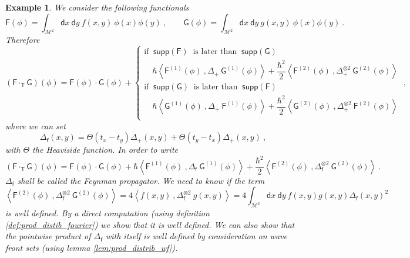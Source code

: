 \documentclass[11pt]{book}
\newcommand{\supp}{\mathsf{supp}}
\newcommand{\sm}[1]{\left\langle#1\right\rangle}
\newcommand{\Mcal}{\mathcal{M}}
\newcommand{\Fsf}{\mathsf{F}}
\newcommand{\Gsf}{\mathsf{G}}
\newcommand{\Tsf}{\mathsf{T}}
\newcommand{\dsf}{\mathsf{d}}
\newcommand{\fsf}{\mathsf{f}}
\theoremstyle{break}
\newtheorem{example}{Example}[chapter]
\begin{document}
\begin{example}
We consider the following functionals
%
\begin{equation*}
\Fsf(\phi) = \int_{\Mcal^2} \dsf x \ \dsf y \ f(x,y) \ \phi(x) \phi(y)\ , \qquad \Gsf(\phi) = \int_{\Mcal^2} \dsf x \ \dsf y \ g(x,y) \ \phi(x) \phi(y) \ .
\end{equation*}
%
Therefore
%
\begin{equation*}
(\Fsf \cdot_\Tsf \Gsf)(\phi) = \Fsf(\phi) \cdot \Gsf(\phi) + 
\left\{
\begin{array}{ll}
\mbox{if } \ \supp(\Fsf) \ \mbox{ is later than  } \ \supp(\Gsf)  \\[4pt]
\quad \hbar \sm{\Fsf^{(1)}(\phi) \ , \Delta_+ \ \Gsf^{(1)}(\phi)} + \dfrac{\hbar^2}{2} \sm{\Fsf^{(2)}(\phi) \ , \Delta_+^{\otimes 2} \ \Gsf^{(2)}(\phi)} \\[8pt]
%
\mbox{if } \ \supp(\Gsf) \ \mbox{ is later than  } \ \supp(\Fsf)  \\[4pt]
\quad \hbar \sm{\Gsf^{(1)}(\phi) \ , \Delta_+ \ \Fsf^{(1)}(\phi)} + \dfrac{\hbar^2}{2} \sm{\Gsf^{(2)}(\phi) \ , \Delta_+^{\otimes 2} \ \Fsf^{(2)}(\phi)} \\
\end{array}
\right. \ ,
\end{equation*}
%
where we can set
%
\begin{equation}
\Delta_\fsf(x,y) = \Theta(t_x-t_y) \Delta_+(x,y) + \Theta(t_y-t_x) \Delta_+(x,y) \ ,
\label{eq:feynman_relation}
\end{equation}
%
with $\Theta$ the Heaviside function. In order to write
%
\begin{equation*}
(\Fsf \cdot_\Tsf \Gsf)(\phi) = \Fsf(\phi) \cdot \Gsf(\phi) + \hbar \sm{\Fsf^{(1)}(\phi) \ , \Delta_\fsf \ \Gsf^{(1)}(\phi)} + \dfrac{\hbar^2}{2} \sm{\Fsf^{(2)}(\phi) \ , \Delta_\fsf^{\otimes 2} \ \Gsf^{(2)}(\phi)} \ .
\end{equation*}
$\Delta_\fsf$ shall be called the Feynman propagator. We need to know if the term
%
\begin{equation*}
\sm{\Fsf^{(2)}(\phi) \ , \Delta_\fsf^{\otimes 2} \ \Gsf^{(2)}(\phi)} = 4 \sm{f(x,y) \ , \Delta_\fsf^{\otimes 2} \ g(x,y)} = 4 \int_{\Mcal^2} \dsf x \ \dsf y \ f(x,y) g(x,y) \Delta_\fsf(x,y)^2
\end{equation*}
%
is well defined. By a direct computation (using definition \ref{def:prod_distib_fourier}) we show that it is well defined. We can also show that the pointwise product of $\Delta_\fsf$ with itself is well defined by consideration on wave front sets (using lemma \ref{lem:prod_distrib_wf}).
\end{example}
\end{document}
